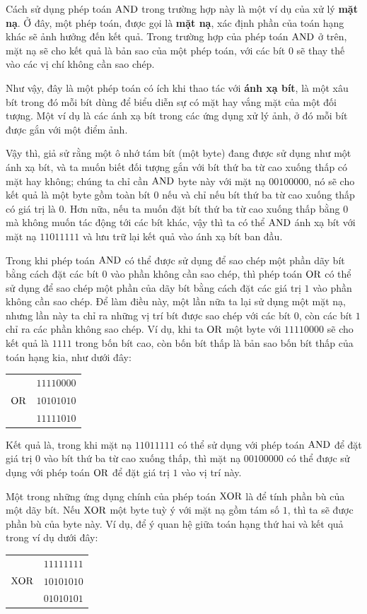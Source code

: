Cách sử dụng phép toán $\operatorname{\mbox{AND}}$ trong trường hợp này là một ví dụ của xử lý \textbf{mặt
  nạ}. Ở đây, một phép toán, được gọi là \textbf{mặt nạ}, xác định phần của toán hạng khác
sẽ ảnh hưởng đến kết quả. Trong trường hợp của phép toán $\operatorname{\mbox{AND}}$ ở trên, mặt nạ sẽ cho kết
quả là bản sao của một phép toán, với các bít $0$ sẽ thay thế vào các vị chí không cần sao
chép.

Như vậy, đây là một phép toán có ích khi thao tác với \textbf{ánh xạ bít}, là một xâu bít
trong đó mỗi bít dùng để biểu diễn sự có mặt hay vắng mặt của một đối tượng. Một ví dụ là
các ánh xạ bít trong các ứng dụng xử lý ảnh, ở đó mỗi bít được gắn với một điểm ảnh.

Vậy thì, giả sử rằng một ô nhớ tám bít (một byte) đang được sử dụng như một ánh xạ bít, và
ta muốn biết đối tượng gắn với bít thứ ba từ cao xuống thấp có mặt hay không; chúng
ta chỉ cần $\operatorname{\mbox{AND}}$ byte này với mặt nạ $00100000$, nó sẽ cho kết quả là một byte gồm toàn
bít $0$ nếu và chỉ nếu bít thứ ba từ cao xuống thấp có giá trị là $0$. Hơn nữa, nếu ta
muốn đặt bít thứ ba từ cao xuống thấp bằng $0$ mà không muốn tác động tới các bít khác,
vậy thì ta có thể $\operatorname{\mbox{AND}}$ ánh xạ bít với mặt nạ $11011111$ và lưu trữ lại kết quả vào
ánh xạ bít ban đầu.

Trong khi phép toán $\operatorname{\mbox{AND}}$ có thể được sử dụng để sao chép một phần dãy bít bằng cách đặt
các bít $0$ vào phần không cần sao chép, thì phép toán $\operatorname{\mbox{OR}}$ có thể sử dụng để sao chép
một phần của dãy bít bằng cách đặt các giá trị $1$ vào phần không cần sao chép. Để làm
điều này, một lần nữa ta lại sử dụng một mặt nạ, nhưng lần này ta chỉ ra những
vị trí bít được sao chép với các bít $0$, còn các bít $1$ chỉ ra các phần không sao
chép. Ví dụ, khi ta $\operatorname{\mbox{OR}}$ một byte với $11110000$ sẽ cho kết quả là $1111$ trong bốn bít
cao, còn bốn bít thấp là bản sao bốn bít thấp của toán hạng kia, như dưới đây:
\begin{flushleft}
  \begin{tabular}{ll}
    & $11110000$ \\
    $\operatorname{\mbox{OR}}$ & $10101010$\\
    \hline
    &$11111010$
  \end{tabular}
\end{flushleft}
Kết quả là, trong khi mặt nạ $11011111$ có thể sử dụng với phép toán $\operatorname{\mbox{AND}}$ để đặt giá trị
$0$ vào bít thứ ba từ cao xuống thấp, thì mặt nạ $00100000$ có thể được sử dụng với phép
toán $\operatorname{\mbox{OR}}$ để đặt giá trị $1$ vào vị trí này.

Một trong những ứng dụng chính của phép toán $\operatorname{\mbox{XOR}}$ là để tính phần bù của một dãy
bít. Nếu $\operatorname{\mbox{XOR}}$ một byte tuỳ ý với mặt nạ gồm tám số $1$, thì ta sẽ được phần bù của byte
này. Ví dụ, để ý quan hệ giữa toán hạng thứ hai và kết quả trong ví dụ dưới đây:
\begin{flushleft}
  \begin{tabular}{ll}
    & $11111111$ \\
    $\operatorname{\mbox{XOR}}$ & $10101010$\\
    \hline
    &$01010101$
  \end{tabular}
\end{flushleft}

